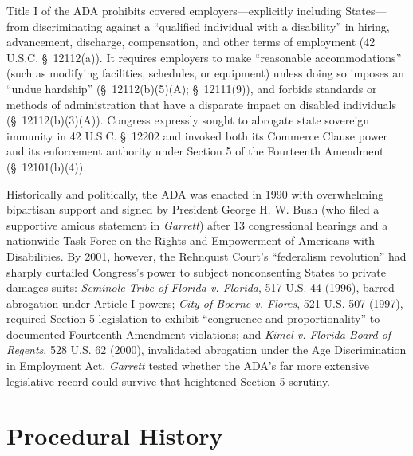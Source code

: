 \documentclass[12pt]{article}
\begin{document}
Title I of the ADA prohibits covered employers---explicitly including States---from discriminating against a ``qualified individual with a disability'' in hiring, advancement, discharge, compensation, and other terms of employment (42 U.S.C. \S~12112(a)). It requires employers to make ``reasonable accommodations'' (such as modifying facilities, schedules, or equipment) unless doing so imposes an ``undue hardship'' (\S~12112(b)(5)(A); \S~12111(9)), and forbids standards or methods of administration that have a disparate impact on disabled individuals (\S~12112(b)(3)(A)). Congress expressly sought to abrogate state sovereign immunity in 42 U.S.C. \S~12202 and invoked both its Commerce Clause power and its enforcement authority under Section 5 of the Fourteenth Amendment (\S~12101(b)(4)).

Historically and politically, the ADA was enacted in 1990 with overwhelming bipartisan support and signed by President George H. W. Bush (who filed a supportive amicus statement in \textit{Garrett}) after 13 congressional hearings and a nationwide Task Force on the Rights and Empowerment of Americans with Disabilities. By 2001, however, the Rehnquist Court's ``federalism revolution'' had sharply curtailed Congress's power to subject nonconsenting States to private damages suits: \textit{Seminole Tribe of Florida v. Florida}, 517 U.S. 44 (1996), barred abrogation under Article I powers; \textit{City of Boerne v. Flores}, 521 U.S. 507 (1997), required Section 5 legislation to exhibit ``congruence and proportionality'' to documented Fourteenth Amendment violations; and \textit{Kimel v. Florida Board of Regents}, 528 U.S. 62 (2000), invalidated abrogation under the Age Discrimination in Employment Act. \textit{Garrett} tested whether the ADA's far more extensive legislative record could survive that heightened Section 5 scrutiny.

\section{Procedural History}
\end{document}
